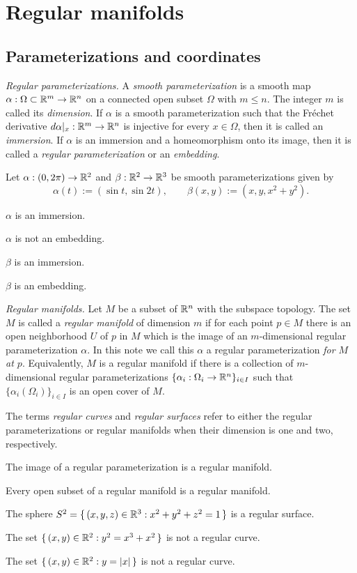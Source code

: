 \documentclass{../note}
\def\a{\alpha}
\begin{document}
\chapter{Regular manifolds}
\section{Parameterizations and coordinates}

\begin{prb}\emph{Regular parameterizations.}
A \emph{smooth parameterization} is a smooth map $\a:\Omega\subset\R^m\to\R^n$ on a connected open subset $\Omega$ with $m\le n$.
The integer $m$ is called its \emph{dimension}.
If $\a$ is a smooth parameterization such that the Fr\'echet derivative $d\a|_x:\R^m\to\R^n$ is injective for every $x\in\Omega$, then it is called an \emph{immersion}.
If $\a$ is an immersion and a homeomorphism onto its image, then it is called a \emph{regular parameterization} or an \emph{embedding}.

Let $\a:(0,2\pi)\to\R^2$ and $\beta:\mathbb{R}^2\to\mathbb{R}^3$ be smooth parameterizations given by
\[\a(t):=(\sin t,\sin2t),\qquad\beta(x,y):=(x,y,x^2+y^2).\]
\begin{parts}
\item $\a$ is an immersion.
\item $\a$ is not an embedding.
\item $\beta$ is an immersion.
\item $\beta$ is an embedding.
\end{parts}
\end{prb}


\begin{prb}\emph{Regular manifolds.}
Let $M$ be a subset of $\mathbb{R}^n$ with the subspace topology.
The set $M$ is called a \emph{regular manifold} of dimension $m$ if for each point $p\in M$ there is an open neighborhood $U$ of $p$ in $M$ which is the image of an $m$-dimensional regular parameterization $\a$.
In this note we call this $\a$ a regular parameterization \emph{for $M$ at $p$}.
Equivalently, $M$ is a regular manifold if there is a collection of $m$-dimensional regular parameterizations $\{\a_i:\Omega_i\to\R^n\}_{i\in I}$ such that $\{\a_i(\Omega_i)\}_{i\in I}$ is an open cover of $M$.

The terms \emph{regular curves} and \emph{regular surfaces} refer to either the regular parameterizations or regular manifolds when their dimension is one and two, respectively. 
\begin{parts}
\item The image of a regular parameterization is a regular manifold.
\item Every open subset of a regular manifold is a regular manifold.
\item The sphere $S^2=\{\,(x,y,z)\in\mathbb{R}^3:x^2+y^2+z^2=1\,\}$ is a regular surface.
\item The set $\{\,(x,y)\in\mathbb{R}^2:y^2=x^3+x^2\,\}$ is not a regular curve.
\item The set $\{\,(x,y)\in\mathbb{R}^2:y=|x|\,\}$ is not a regular curve.
\end{parts}
\end{prb}
\end{document}
